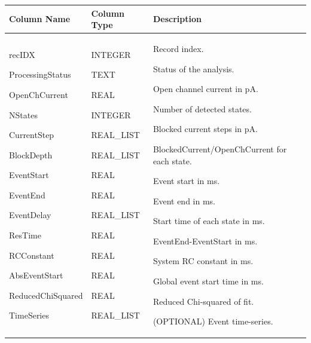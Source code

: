 \documentclass[letterpaper,10pt,english]{sphinxmanual}
\begin{document}
\begin{tabulary}{\linewidth}{p{4cm}p{4cm}p{8cm}}
\hline
\textsf{\relax 
\textbf{Column Name}
} & \textsf{\relax 
\textbf{Column Type}
} & \textsf{\relax 
\textbf{Description}
}\\
\hline
recIDX

ProcessingStatus

OpenChCurrent

NStates

CurrentStep

BlockDepth

EventStart

EventEnd

EventDelay

ResTime

RCConstant

AbsEventStart

ReducedChiSquared

TimeSeries
 & 
INTEGER

TEXT

REAL

INTEGER

REAL\_LIST

REAL\_LIST

REAL

REAL

REAL\_LIST

REAL

REAL

REAL

REAL

REAL\_LIST
 & 
Record index.

Status of the analysis.

Open channel current in pA.

Number of detected states.

Blocked current steps in pA.

BlockedCurrent/OpenChCurrent for each state.

Event start in ms.

Event end in ms.

Start time of each state in ms.

EventEnd-EventStart in ms.

System RC constant in ms.

Global event start time in ms.

Reduced Chi-squared of fit.

(OPTIONAL) Event time-series.
\\
\hline\end{tabulary}
\end{document}
